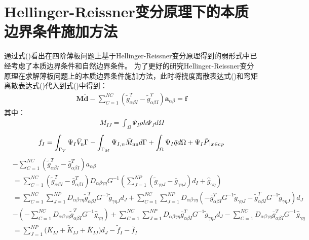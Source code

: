 \section{Hellinger-Reissner变分原理下的本质边界条件施加方法}
通过式()看出在四阶薄板问题上基于Hellinger-Reissner变分原理得到的弱形式中已经考虑了本质边界条件和自然边界条件。
为了更好的研究Hellinger-Reissner变分原理在求解薄板问题上的本质边界条件施加方法，此时将挠度离散表达式()和弯矩离散表达式()代入到式()中得到：
\begin{equation}
\begin{split}
    {\pmb{M\ddot d}} - \sum\limits_{C = 1}^{NC} {(\tilde g_{\alpha \beta I}^T - \tilde g_{\alpha \beta I}^T)}\pmb{a}_{\alpha \beta } = \pmb{f}
\end{split}
\end{equation}
其中：
\begin{equation}
\begin{split}
    {M_{IJ}} = \int_\Omega{{\Psi _I}}\rho h{\Psi _J}d\Omega 
\end{split}
\end{equation}
\begin{equation}
\begin{split}
    {f_I} = \int_{{\Gamma _V}} {{\Psi _I}} {{\bar V}_{\rm{n}}}\Gamma  - \int_{{\Gamma _M}} {{\Psi _{I,n}}} {{\bar M}_{{\rm{nn}}}}d\Gamma  + \int_\Omega  {{\Psi _I}} \bar qd\Omega  + {\Psi _I}\bar P{|_{x \in {c_P}}}    
\end{split}
\end{equation}
\begin{equation}
\begin{split}
&- \sum\limits_{C = 1}^{NC} {(\tilde g_{\alpha \beta I}^T - \bar g_{\alpha \beta I}^T)} {a_{\alpha \beta }}\\
&= \sum\limits_{C = 1}^{NC} ( \tilde g_{\alpha \beta I}^T - \bar g_{\alpha \beta I}^T){D_{\alpha \beta \gamma \eta }}{G^{ - 1}}(\sum\limits_{J = 1}^{NP} ( {{\tilde g}_{\gamma \eta J}} - {{\bar g}_{\gamma \eta J}}){d_I} + {{\hat g}_{\gamma \eta }})\\
&= \sum\limits_{C = 1}^{NC} {\sum\limits_{J = 1}^{NP} {{D_{\alpha \beta \gamma \eta }}} } \tilde g_{\alpha \beta I}^T{G^{ - 1}}{{\tilde g}_{\gamma \eta J}}{d_J} + \sum\limits_{C = 1}^{NC} {\sum\limits_{J = 1}^{NP} {{D_{\alpha \beta \gamma \eta }}} } ( - \bar g_{\alpha \beta I}^T{G^{ - 1}}{{\tilde g}_{\gamma \eta J}} - \tilde g_{\alpha \beta I}^T{G^{ - 1}}{{\tilde g}_{\gamma \eta J}}){d_J}\\
&- ( - \sum\limits_{C = 1}^{NC} {{D_{\alpha \beta \gamma \eta }}} \tilde g_{\alpha \beta I}^T{G^{ - 1}}{{\hat g}_{\gamma \eta }}) + \sum\limits_{C = 1}^{NC} {\sum\limits_{J = 1}^{NP} {{D_{\alpha \beta \gamma \eta }}} } \bar g_{\alpha \beta I}^T{G^{ - 1}}{{\tilde g}_{\gamma \eta J}}{d_J} - \sum\limits_{C = 1}^{NC} {{D_{\alpha \beta \gamma \eta }}} \bar g_{\alpha \beta I}^T{G^{ - 1}}{{\hat g}_{\gamma \eta }}\\
&= \sum\limits_{J = 1}^{NP} {(K_{IJ}^{}}  + {{\tilde K}_{IJ}} + {{\bar K}_{IJ}}){d_J} - {{\tilde f}_I} - {{\bar f}_I}
\end{split}
\end{equation}
